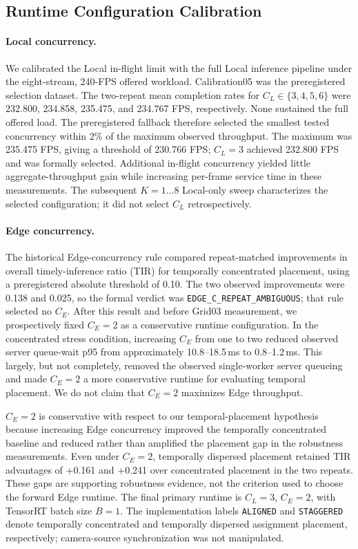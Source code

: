 \subsection{Runtime Configuration Calibration}\label{sec:runtime-configuration-calibration}
\paragraph{Local concurrency.}
We calibrated the Local in-flight limit with the full Local inference pipeline under the eight-stream, 240-FPS offered workload. Calibration05 was the preregistered selection dataset. The two-repeat mean completion rates for $C_L\in\{3,4,5,6\}$ were 232.800, 234.858, 235.475, and 234.767 FPS, respectively. None sustained the full offered load. The preregistered fallback therefore selected the smallest tested concurrency within 2\% of the maximum observed throughput. The maximum was 235.475 FPS, giving a threshold of 230.766 FPS; $C_L=3$ achieved 232.800 FPS and was formally selected. Additional in-flight concurrency yielded little aggregate-throughput gain while increasing per-frame service time in these measurements. The subsequent $K=1\ldots8$ Local-only sweep characterizes the selected configuration; it did not select $C_L$ retrospectively.

\paragraph{Edge concurrency.}
The historical Edge-concurrency rule compared repeat-matched improvements in overall timely-inference ratio (TIR) for temporally concentrated placement, using a preregistered absolute threshold of 0.10. The two observed improvements were 0.138 and 0.025, so the formal verdict was \texttt{EDGE\_C\_REPEAT\_AMBIGUOUS}; that rule selected no $C_E$. After this result and before Grid03 measurement, we prospectively fixed $C_E=2$ as a conservative runtime configuration. In the concentrated stress condition, increasing $C_E$ from one to two reduced observed server queue-wait p95 from approximately 10.8--18.5\,ms to 0.8--1.2\,ms. This largely, but not completely, removed the observed single-worker server queueing and made $C_E=2$ a more conservative runtime for evaluating temporal placement. We do not claim that $C_E=2$ maximizes Edge throughput.

$C_E=2$ is conservative with respect to our temporal-placement hypothesis because increasing Edge concurrency improved the temporally concentrated baseline and reduced rather than amplified the placement gap in the robustness measurements. Even under $C_E=2$, temporally dispersed placement retained TIR advantages of +0.161 and +0.241 over concentrated placement in the two repeats. These gaps are supporting robustness evidence, not the criterion used to choose the forward Edge runtime. The final primary runtime is $C_L=3$, $C_E=2$, with TensorRT batch size $B=1$. The implementation labels \texttt{ALIGNED} and \texttt{STAGGERED} denote temporally concentrated and temporally dispersed assignment placement, respectively; camera-source synchronization was not manipulated.
